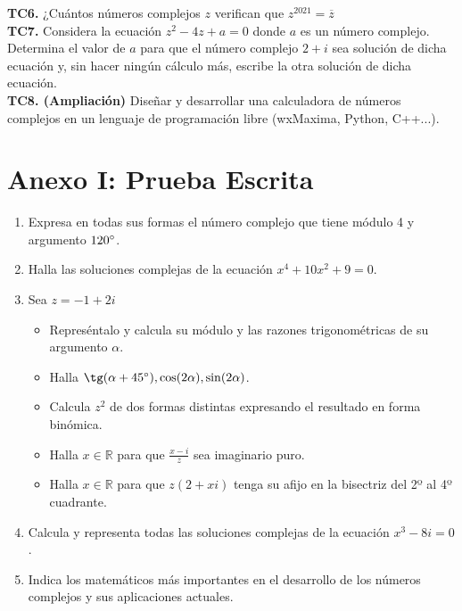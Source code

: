\documentclass[../main.tex]{memoir}
\begin{document}
\textbf{TC6.} ¿Cuántos números complejos $z$ verifican que $z^{2021} = \overline{z}$ \\

\textbf{TC7.} Considera la ecuación $z^2-4z+a=0$ donde $a$ es un número complejo. Determina el valor de $a$ para que el número complejo $2+i$ sea solución de dicha ecuación y, sin hacer ningún cálculo más, escribe la otra solución de dicha ecuación. \\

\textbf{TC8. (Ampliación)} Diseñar y desarrollar una calculadora de números complejos en un lenguaje de programación libre (wxMaxima, Python, C++...).

\newpage

\chapter{Anexo I: Prueba Escrita}

\begin{enumerate}
	\item Expresa en todas sus formas el número complejo que tiene módulo 4 y argumento $120\degree$.
	\item Halla las soluciones complejas de la ecuación $x^4+10x^2+9=0$.
	\item Sea $z=-1+2i$
	\begin{itemize}
		\item Represéntalo y calcula su módulo y las razones trigonométricas de su argumento $\alpha$.
		\item Halla $\tg(\alpha+45\degree), \cos(2\alpha), \sin(2\alpha)$.
		\item Calcula $z^2$ de dos formas distintas expresando el resultado en forma binómica.
		\item Halla $x \in \mathbb{R}$ para que $\frac{x-i}{z}$ sea imaginario puro.
		\item Halla $x \in \mathbb{R}$ para que $z(2+xi)$ tenga su afijo en la bisectriz del 2º al 4º cuadrante.
	\end{itemize}
	\item Calcula y representa todas las soluciones complejas de la ecuación $x^3-8i=0$.
	\item Indica los matemáticos más importantes en el desarrollo de los números complejos y sus aplicaciones actuales.
\end{enumerate}
\end{document}
